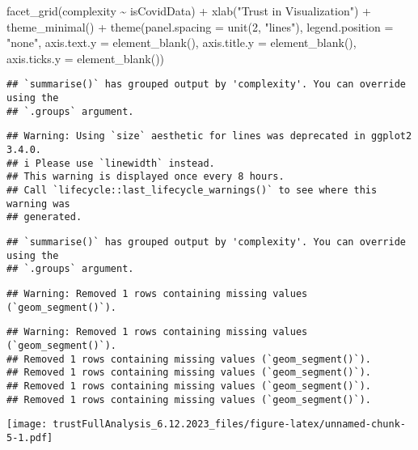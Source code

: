 \documentclass[
]{article}
\newenvironment{Shaded}{\begin{snugshade}}{\end{snugshade}}
\newcommand{\AttributeTok}[1]{\textcolor[rgb]{0.77,0.63,0.00}{#1}}
\newcommand{\DecValTok}[1]{\textcolor[rgb]{0.00,0.00,0.81}{#1}}
\newcommand{\FunctionTok}[1]{\textcolor[rgb]{0.00,0.00,0.00}{#1}}
\newcommand{\NormalTok}[1]{#1}
\newcommand{\SpecialCharTok}[1]{\textcolor[rgb]{0.00,0.00,0.00}{#1}}
\newcommand{\StringTok}[1]{\textcolor[rgb]{0.31,0.60,0.02}{#1}}
\begin{document}
\begin{Shaded}
\begin{Highlighting}[]
  \FunctionTok{facet\_grid}\NormalTok{(complexity }\SpecialCharTok{\textasciitilde{}}\NormalTok{ isCovidData) }\SpecialCharTok{+}
  \FunctionTok{xlab}\NormalTok{(}\StringTok{"Trust in Visualization"}\NormalTok{) }\SpecialCharTok{+}
  \FunctionTok{theme\_minimal}\NormalTok{() }\SpecialCharTok{+} 
  \FunctionTok{theme}\NormalTok{(}\AttributeTok{panel.spacing =} \FunctionTok{unit}\NormalTok{(}\DecValTok{2}\NormalTok{, }\StringTok{"lines"}\NormalTok{),}
        \AttributeTok{legend.position =} \StringTok{"none"}\NormalTok{,}
        \AttributeTok{axis.text.y =} \FunctionTok{element\_blank}\NormalTok{(),}
        \AttributeTok{axis.title.y =} \FunctionTok{element\_blank}\NormalTok{(),}
        \AttributeTok{axis.ticks.y =} \FunctionTok{element\_blank}\NormalTok{())}
\end{Highlighting}
\end{Shaded}

\begin{verbatim}
## `summarise()` has grouped output by 'complexity'. You can override using the
## `.groups` argument.
\end{verbatim}

\begin{verbatim}
## Warning: Using `size` aesthetic for lines was deprecated in ggplot2 3.4.0.
## i Please use `linewidth` instead.
## This warning is displayed once every 8 hours.
## Call `lifecycle::last_lifecycle_warnings()` to see where this warning was
## generated.
\end{verbatim}

\begin{verbatim}
## `summarise()` has grouped output by 'complexity'. You can override using the
## `.groups` argument.
\end{verbatim}

\begin{verbatim}
## Warning: Removed 1 rows containing missing values (`geom_segment()`).
\end{verbatim}

\begin{verbatim}
## Warning: Removed 1 rows containing missing values (`geom_segment()`).
## Removed 1 rows containing missing values (`geom_segment()`).
## Removed 1 rows containing missing values (`geom_segment()`).
## Removed 1 rows containing missing values (`geom_segment()`).
## Removed 1 rows containing missing values (`geom_segment()`).
\end{verbatim}

\texttt{[image: trustFullAnalysis\_6.12.2023\_files/figure-latex/unnamed-chunk-5-1.pdf]}
\end{document}
